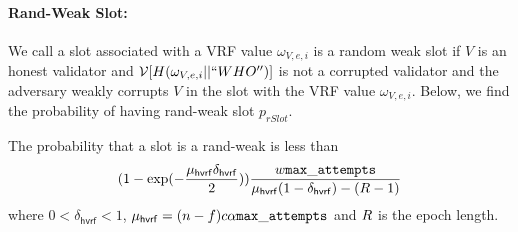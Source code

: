 \paragraph{Rand-Weak Slot:} We call a slot associated with a VRF value $ \omega_{V,e,i} $ is a random weak slot  if $ V $ is an honest validator and $ \mathcal{V}[H(\omega_{V,e,i}||``WHO'')] $ is not a corrupted validator and the adversary weakly corrupts $ V $ in the slot with the VRF value $ \omega_{V,e,i} $.  Below, we find the probability of having rand-weak slot $ p_{rSlot} $.

\begin{lemma}\label{lem:pr}
	The probability that a slot is a rand-weak is less than $$(1 - \exp(-\frac{\mu_{\mathsf{hvrf}}\delta_{\mathsf{hvrf}}}{2}))\frac{w \mathtt{max\_attempts} }{\mu_{\mathsf{hvrf}} (1- \delta_{\mathsf{hvrf}}) - (R  -1)} $$ where $ 0 < \delta_{\mathsf{hvrf}} < 1 $, $ \mu_{\mathsf{hvrf}} = (n-f)c\alpha\mathtt{max\_attempts} $ and  $ R  $ is the epoch length.
\end{lemma}

